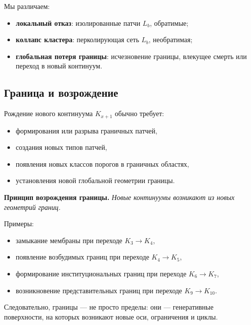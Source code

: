 Мы различаем:
\begin{itemize}
    \item \textbf{локальный отказ}: изолированные патчи \(L_b\), обратимые;
    \item \textbf{коллапс кластера}: перколирующая сеть \(L_b\), необратимая;
    \item \textbf{глобальная потеря границы}: исчезновение границы, влекущее
          смерть или переход в новый континуум.
\end{itemize}

\subsection{Граница и возрождение}

Рождение нового континуума \(K_{x+1}\) обычно требует:
\begin{itemize}
    \item формирования или разрыва граничных патчей,
    \item создания новых типов патчей,
    \item появления новых классов порогов в граничных областях,
    \item установления новой глобальной геометрии границы.
\end{itemize}

\textbf{Принцип возрождения границы.}
\emph{Новые континуумы возникают из новых геометрий границ.}

Примеры:
\begin{itemize}
    \item замыкание мембраны при переходе \(K_3 \to K_4\),
    \item появление возбудимых границ при переходе \(K_4 \to K_5\),
    \item формирование институциональных границ при переходе \(K_6 \to K_7\),
    \item возникновение представительных границ при переходе \(K_9 \to K_{10}\).
\end{itemize}

Следовательно, границы — не просто пределы:
они — генеративные поверхности, на которых возникают новые оси, ограничения и
циклы.



